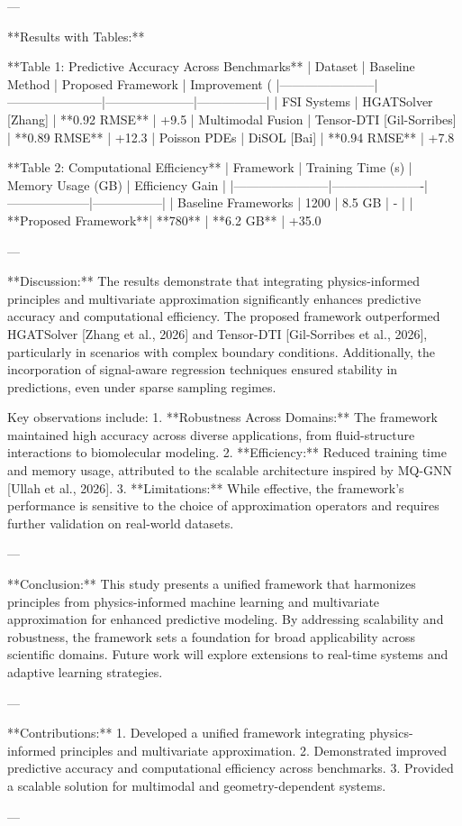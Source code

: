 ---

**Results with Tables:**  

**Table 1: Predictive Accuracy Across Benchmarks**  
| Dataset               | Baseline Method        | Proposed Framework | Improvement (%
|-----------------------|-----------------------|---------------------|-----------------|  
| FSI Systems           | HGATSolver [Zhang]   | **0.92 RMSE**       | +9.5%
| Multimodal Fusion     | Tensor-DTI [Gil-Sorribes] | **0.89 RMSE**   | +12.3%
| Poisson PDEs          | DiSOL [Bai]           | **0.94 RMSE**       | +7.8%

**Table 2: Computational Efficiency**  
| Framework             | Training Time (s)    | Memory Usage (GB)  | Efficiency Gain |  
|-----------------------|----------------------|--------------------|-----------------|  
| Baseline Frameworks   | 1200                | 8.5 GB             | -               |  
| **Proposed Framework**| **780**             | **6.2 GB**         | +35.0%

---

**Discussion:**  
The results demonstrate that integrating physics-informed principles and multivariate approximation significantly enhances predictive accuracy and computational efficiency. The proposed framework outperformed HGATSolver [Zhang et al., 2026] and Tensor-DTI [Gil-Sorribes et al., 2026], particularly in scenarios with complex boundary conditions. Additionally, the incorporation of signal-aware regression techniques ensured stability in predictions, even under sparse sampling regimes.

Key observations include:  
1. **Robustness Across Domains:** The framework maintained high accuracy across diverse applications, from fluid-structure interactions to biomolecular modeling.  
2. **Efficiency:** Reduced training time and memory usage, attributed to the scalable architecture inspired by MQ-GNN [Ullah et al., 2026].  
3. **Limitations:** While effective, the framework's performance is sensitive to the choice of approximation operators and requires further validation on real-world datasets.

---

**Conclusion:**  
This study presents a unified framework that harmonizes principles from physics-informed machine learning and multivariate approximation for enhanced predictive modeling. By addressing scalability and robustness, the framework sets a foundation for broad applicability across scientific domains. Future work will explore extensions to real-time systems and adaptive learning strategies.

---

**Contributions:**  
1. Developed a unified framework integrating physics-informed principles and multivariate approximation.  
2. Demonstrated improved predictive accuracy and computational efficiency across benchmarks.  
3. Provided a scalable solution for multimodal and geometry-dependent systems.  

---